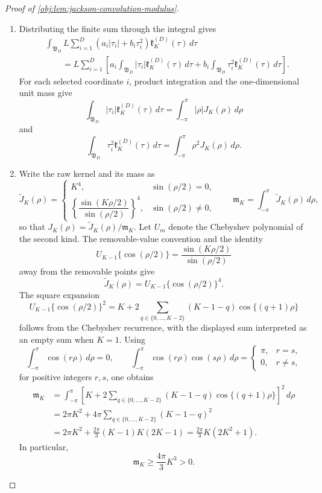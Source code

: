 \begin{proof}[Proof of \cref{obj:lem:jackson-convolution-modulus}]
\begin{enumerate}
\item Distributing the finite sum through the integral gives
\[
\begin{aligned}
&\int_{\mathfrak B_D}
L\sum_{i=1}^D\left(a_i|\tau_i|+b_i\tau_i^2\right)
\mathfrak k_K^{(D)}(\tau)\,d\tau  \\
&\qquad =
L\sum_{i=1}^D
\left[
a_i\int_{\mathfrak B_D}|\tau_i|\mathfrak k_K^{(D)}(\tau)\,d\tau
+
b_i\int_{\mathfrak B_D}\tau_i^2\mathfrak k_K^{(D)}(\tau)\,d\tau
\right].
\end{aligned}
\]
For each selected coordinate \(i\), product integration and the one-dimensional unit mass give
\[
\int_{\mathfrak B_D}|\tau_i|\mathfrak k_K^{(D)}(\tau)\,d\tau
=
\int_{-\pi}^{\pi}|\rho|J_K(\rho)\,d\rho
\]
and
\[
\int_{\mathfrak B_D}\tau_i^2\mathfrak k_K^{(D)}(\tau)\,d\tau
=
\int_{-\pi}^{\pi}\rho^2J_K(\rho)\,d\rho .
\] %

\item Write the raw kernel and its mass as
\[
\widetilde J_K(\rho)=
\begin{cases}
K^4, & \sin(\rho/2)=0,\\[2mm]
\left\{\dfrac{\sin(K\rho/2)}{\sin(\rho/2)}\right\}^4,
& \sin(\rho/2)\ne0,
\end{cases}
\qquad
\mathfrak m_K=\int_{-\pi}^{\pi}\widetilde J_K(\rho)\,d\rho,
\]
so that \(J_K(\rho)=\widetilde J_K(\rho)/\mathfrak m_K\). Let \(U_m\) denote the Chebyshev polynomial of the second kind. The removable-value convention and the identity
\[
U_{K-1}\{\cos(\rho/2)\}
=
\frac{\sin(K\rho/2)}{\sin(\rho/2)}
\]
away from the removable points give
\[
\widetilde J_K(\rho)
=
U_{K-1}\{\cos(\rho/2)\}^4 .
\]
The square expansion
\[
U_{K-1}\{\cos(\rho/2)\}^2
=
K+2\sum_{q\in\{0,\ldots,K-2\}}(K-1-q)\cos\{(q+1)\rho\}
\]
follows from the Chebyshev recurrence, with the displayed sum interpreted as an empty sum when \(K=1\). Using
\[
\int_{-\pi}^{\pi}\cos(r\rho)\,d\rho=0,
\qquad
\int_{-\pi}^{\pi}\cos(r\rho)\cos(s\rho)\,d\rho
=
\begin{cases}
\pi,& r=s,\\
0,& r\ne s,
\end{cases}
\]
for positive integers \(r,s\), one obtains
\[
\begin{aligned}
\mathfrak m_K
&=
\int_{-\pi}^{\pi}
\left[
K+2\sum_{q\in\{0,\ldots,K-2\}}(K-1-q)\cos\{(q+1)\rho\}
\right]^2\,d\rho  \\
&=
2\pi K^2+4\pi\sum_{q\in\{0,\ldots,K-2\}}(K-1-q)^2  \\
&=
2\pi K^2+\frac{2\pi}{3}(K-1)K(2K-1)
=
\frac{2\pi}{3}K(2K^2+1).
\end{aligned}
\]
In particular,
\[
\mathfrak m_K\ge \frac{4\pi}{3}K^3>0 .
\] %


\end{enumerate}
\end{proof}
